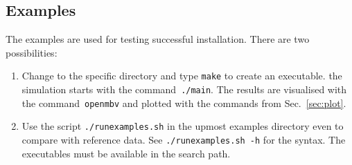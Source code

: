 \subsection{\MBSim Examples}
The examples are used for testing successful installation. There are two possibilities:
\begin{enumerate}
\item Change to the specific directory and type \texttt{make} to create an executable. the simulation starts with the command~\texttt{./main}. The results are visualised with the command~\texttt{openmbv} and plotted with the commands from Sec.~\ref{sec:plot}.
\item Use the script \texttt{./runexamples.sh} in the upmost examples directory even to compare with reference data. See \texttt{./runexamples.sh -h} for the syntax. The \HDF{} executables must be available in the search path.
\end{enumerate}

